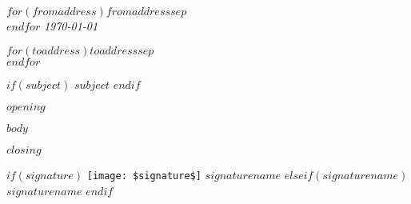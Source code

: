 \documentclass[
	12pt, %
]{letter}
\begin{document}
\begingroup
	\raggedleft %
	\small %
	$for(fromaddress)$$fromaddress$$sep$\\$endfor$
	\bigskip %
	{\normalsize\textit{\today}}\\ %
\endgroup

\begingroup
	$for(toaddress)$$toaddress$$sep$\\$endfor$
\endgroup

\bigskip %

$if(subject)$
	\textbf{$subject$}
$endif$

\medskip %

$opening$

\smallskip %


$body$


\smallskip %

$closing$

$if(signature)$
	\texttt{[image: \$signature\$]} %
	\smallskip
	$signaturename$
$elseif(signaturename)$
	\bigskip\bigskip\bigskip %
	$signaturename$
$endif$

\end{document}
